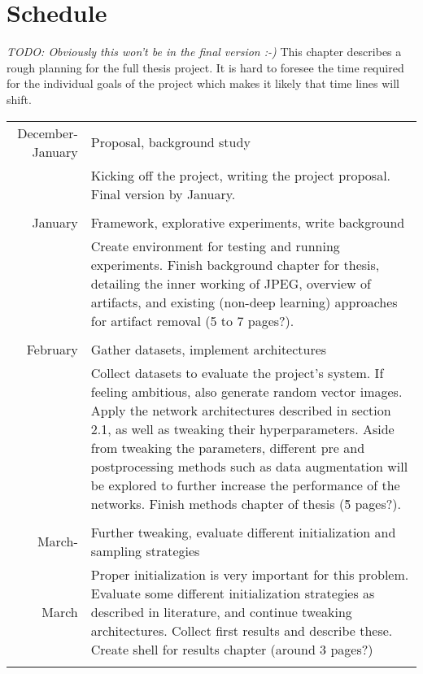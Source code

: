 
\chapter{Schedule}
\textit{TODO: Obviously this won't be in the final version :-)}
This chapter describes a rough planning for the full thesis project. It is hard to foresee the time required for the individual goals of the project which makes it likely that time lines will shift.

\bigskip
\bigskip

\begin{longtable}{r|p{9cm}}
 December-January & Proposal, background study \\
 &\footnotesize{Kicking off the project, writing the project proposal. Final version by January.}\\\multicolumn{2}{c}{} \\
 
 January & Framework, explorative experiments, write background \\
 &\footnotesize{Create environment for testing and running experiments. Finish background chapter for thesis, detailing the inner working of JPEG, overview of artifacts, and existing (non-deep learning) approaches for artifact removal (5 to 7 pages?).}\\\multicolumn{2}{c}{} \\
 
February & Gather datasets, implement architectures\\
&\footnotesize{Collect datasets to evaluate the project's system. If feeling ambitious, also generate random vector images. Apply the network architectures described in section 2.1, as well as tweaking their hyperparameters. Aside from tweaking the parameters, different pre and postprocessing methods such as data augmentation will be explored to further increase the performance of the networks. Finish methods chapter of thesis (\~5 pages?).}\\\multicolumn{2}{c}{} \\
 
  March- & Further tweaking, evaluate different initialization and sampling strategies \\
 March&\footnotesize{Proper initialization is very important for this problem. Evaluate some different initialization strategies as described in literature, and continue tweaking architectures. Collect first results and describe these. Create shell for results chapter (around 3 pages?)   }\\\multicolumn{2}{c}{} \\
 

\end{longtable}
